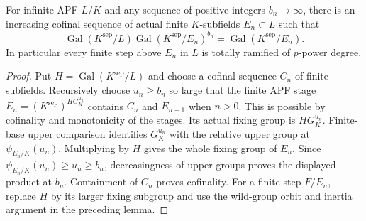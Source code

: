 \begin{lemma}
\label{fw:separable-deep-coordinate-stages}
\leanok
For infinite APF $L/K$ and any sequence of positive integers
$b_n\to\infty$, there is an increasing cofinal sequence of actual
finite $K$-subfields $E_n\subset L$ such that
\[
 \operatorname{Gal}(K^{\mathrm{sep}}/L)
 \operatorname{Gal}(K^{\mathrm{sep}}/E_n)^{b_n}
       =\operatorname{Gal}(K^{\mathrm{sep}}/E_n).
\]
In particular every finite step above $E_n$ in $L$ is totally
ramified of $p$-power degree.
\end{lemma}
\begin{proof}
Put $H=\operatorname{Gal}(K^{\mathrm{sep}}/L)$ and choose a cofinal
sequence $C_n$ of finite subfields. Recursively choose $u_n\geq b_n$
so large that the finite APF stage $E_n=(K^{\mathrm{sep}})^{H G_K^{u_n}}$
contains $C_n$ and $E_{n-1}$ when $n>0$. This is possible by
cofinality and monotonicity of the stages. Its actual fixing group is
$H G_K^{u_n}$. Finite-base upper comparison identifies
$G_K^{u_n}$ with the relative upper group at
$\psi_{E_n/K}(u_n)$. Multiplying by $H$ gives the whole fixing
group of $E_n$. Since $\psi_{E_n/K}(u_n)\geq u_n\geq b_n$,
decreasingness of upper groups proves the displayed product at $b_n$.
Containment of $C_n$ proves cofinality. For a finite step $F/E_n$,
replace $H$ by its larger fixing subgroup and use the wild-group
orbit and inertia argument in the preceding lemma.
\end{proof}

